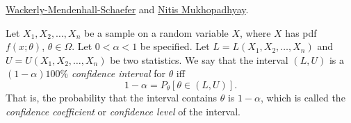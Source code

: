 \href{https://www.amazon.sg/Mathematical-Statistics-Applications-William-Mendenhall/dp/0495110817#customerReviews}{Wackerly-Mendenhall-Schaefer}
and \href{https://www.amazon.com/Probability-Statistical-Inference-Statistics-Monographs/dp/0824703790}{Nitis Mukhopadhyay}.
\begin{definition}{}{}
  Let \(X_1,X_2,\dots,X_n\) be a sample on a random variable \(X\), where \(X\) has pdf \(f(x;\theta)\), \(\theta \in \Omega\). Let \(0<\alpha<1\) be specified. Let \(L=L(X_1,X_2,\dots,X_n)\) and \(U=U(X_1,X_2,\dots,X_n)\) be two statistics. We say that the interval \((L,U)\) is a \((1-\alpha)100\%\) \emph{confidence interval} for \(\theta\) iff 
  \[1-\alpha=P_\theta[\theta \in (L,U)].\]
  That is, the probability that the interval contains \(\theta\) is \(1-\alpha\), which is called the \emph{confidence coefficient} or \emph{confidence level} of the interval.
\end{definition}
